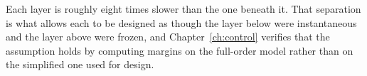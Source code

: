 Each layer is roughly eight times slower than the one beneath it. That
separation is what allows each to be designed as though the layer below were
instantaneous and the layer above were frozen, and Chapter~\ref{ch:control}
verifies that the assumption holds by computing margins on the full-order model
rather than on the simplified one used for design.
